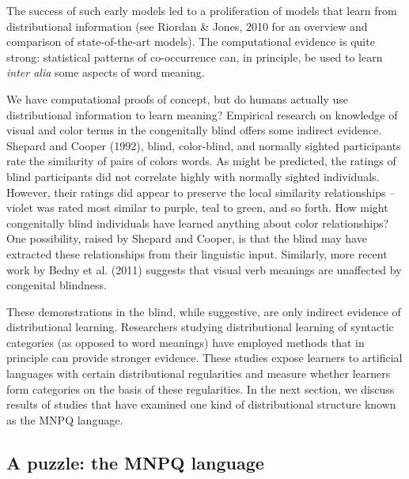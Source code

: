 \documentclass[man,floatsintext]{apa6}
\begin{document}
The success of such early models led to a proliferation of
models that learn from distributional information (see
Riordan \& Jones, 2010 for an overview and comparison of
state-of-the-art models). The computational evidence is quite strong:
statistical patterns of co-occurrence can, in principle, be used to
learn \emph{inter alia} some aspects of word meaning.

We have computational proofs of concept, but do humans actually use
distributional information to learn meaning? Empirical research on
knowledge of visual and color terms in the congenitally blind offers
some indirect evidence. Shepard and Cooper (1992), blind,
color-blind, and normally sighted participants rate the similarity of
pairs of colors words. As might be predicted, the ratings of blind
participants did not correlate highly with normally sighted
individuals. However, their ratings did appear to preserve the local
similarity relationships -- violet was rated most similar to purple,
teal to green, and so forth. How might congenitally blind individuals
have learned anything about color relationships? One possibility,
raised by Shepard and Cooper, is that the blind may have extracted
these relationships from their linguistic input. Similarly, more
recent work by Bedny et al. (2011) suggests that visual verb meanings
are unaffected by congenital blindness.

These demonstrations in the blind, while suggestive, are only indirect
evidence of distributional learning. Researchers studying
distributional learning of syntactic categories (as opposed to word
meanings) have employed methods that in principle can provide stronger
evidence. These studies expose learners to artificial languages with
certain distributional regularities and measure whether learners form
categories on the basis of these regularities. In the next section, we
discuss results of studies that have examined one kind of
distributional structure known as the MNPQ language.

\subsection{A puzzle: the MNPQ language}
\end{document}
